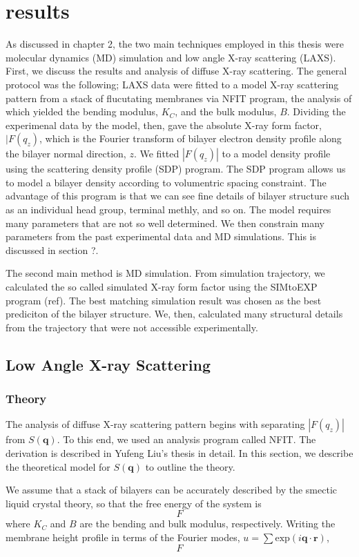 \chapter{results}
As discussed in chapter 2, the two main techniques employed in this thesis 
were molecular dynamics (MD) simulation and low angle X-ray scattering (LAXS).
First, we discuss the results and analysis of diffuse X-ray scattering. The
general protocol was the following; LAXS data were fitted to a model X-ray
scattering pattern from a stack of flucutating membranes via NFIT program,
the analysis of which yielded the bending modulus, $K_C$, and the bulk
modulus, $B$. Dividing the experimenal data by the model, then, gave the 
absolute X-ray form factor, $|F(q_z)$, which is the Fourier transform
of bilayer electron density profile along the bilayer normal direction, $z$. 
We fitted $|F(q_z)|$ to a model density profile using the scattering density
profile (SDP) program. The SDP program allows us to model a bilayer density
according to volumentric spacing constraint. The advantage of this program is
that we can see fine details of bilayer structure such as an individual
head group, terminal methly, and so on. The model requires many parameters
that are not so well determined. We then constrain many parameters from
the past experimental data and MD simulations. This is discussed in 
section ?.

The second main method is MD simulation. From simulation trajectory, we 
calculated the so called simulated X-ray form factor using the SIMtoEXP
program (ref). The best matching simulation result was chosen as the best
prediciton of the bilayer structure. We, then, calculated many structural
details from the trajectory that were not accessible experimentally.   

\section{Low Angle X-ray Scattering}
\subsection{Theory}
The analysis of diffuse X-ray scattering pattern begins with separating 
$|F(q_z)|$ from $S(\mathbf{q})$. To this end, we used an analysis program
called NFIT. The derivation is described in Yufeng Liu's thesis in detail. 
In this section, we describe the theoretical model for $S(\mathbf{q})$ to 
outline the theory. 

We assume that a stack of bilayers can be accurately
described by the smectic liquid crystal theory, so that the free energy of 
the system is
\begin{equation}
  F
\end{equation}
where $K_C$ and $B$ are the bending and bulk modulus, respectively. 
Writing the membrane height profile in terms of the Fourier modes,
$u=\sum \mathrm{exp}(i\mathbf{q} \cdot \mathbf{r})$, 
\begin{equation}
  F
\end{equation}


